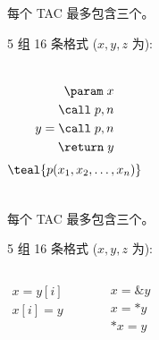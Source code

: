 \begin{frame}{}
  \begin{definition}
    每个 TAC 最多包含三个。
  \end{definition}

  \vspace{0.80cm}
  \begin{center}
    5 组 16 条格式 ($x, y, z$ 为):
  \end{center}
  \begin{columns}
      \begin{align}
        \param\; x \\
        \call\; p, n \\
        y = \call\; p, n \\
        \return\; y
      \end{align}
      \[
        \teal{p(x_{1}, x_{2}, \dots, x_{n})}
      \]
  \end{columns}
\end{frame}

\begin{frame}{}
  \begin{definition}
    每个 TAC 最多包含三个。
  \end{definition}

  \vspace{0.80cm}
  \begin{center}
    5 组 16 条格式 ($x, y, z$ 为):
  \end{center}
  \begin{columns}
      \begin{align}
        x = y[i] \\
        x[i] = y
      \end{align}
      \begin{center}
      \end{center}
      \pause
      \begin{align}
        x = \&y \\
        x = \ast y \\
        \ast x = y
      \end{align}
  \end{columns}
\end{frame}

